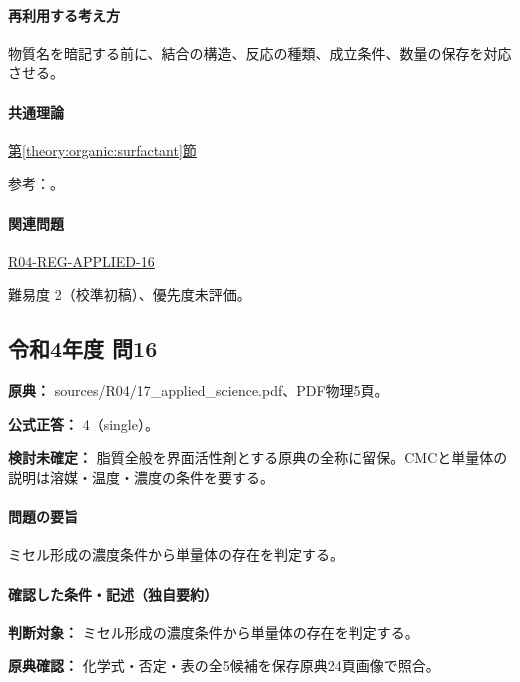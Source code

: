 \paragraph{再利用する考え方} 物質名を暗記する前に、結合の構造、反応の種類、成立条件、数量の保存を対応させる。

\paragraph{共通理論} \hyperref[theory:organic:surfactant]{第\ref*{theory:organic:surfactant}節}

\par 参考：\cite{organic_cmc}。

\paragraph{関連問題} \hyperref[q:r04-reg-applied-16]{R04-REG-APPLIED-16}

\par 難易度 2（校準初稿）、優先度未評価。

\subsection{令和4年度 問16}
\label{q:r04-reg-applied-16}

\noindent\textbf{原典：} sources/R04/17\_applied\_science.pdf、PDF物理5頁。

\textbf{公式正答：} 4（single）。

\par\textbf{検討未確定：} 脂質全般を界面活性剤とする原典の全称に留保。CMCと単量体の説明は溶媒・温度・濃度の条件を要する。

\paragraph{問題の要旨} ミセル形成の濃度条件から単量体の存在を判定する。

\paragraph{確認した条件・記述（独自要約）}\mbox{}\par

\noindent\textbf{判断対象：} ミセル形成の濃度条件から単量体の存在を判定する。\par

\noindent\textbf{原典確認：} 化学式・否定・表の全5候補を保存原典24頁画像で照合。\par

